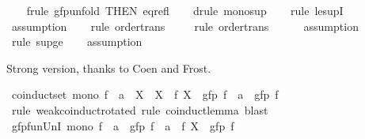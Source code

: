 \begin{isabellebody}
%
\isadelimproof
\ \ %
\endisadelimproof
%
\isatagproof
{}\isamarkupfalse%
\ {\isacharparenleft}{\kern0pt}frule\ gfp{\isacharunderscore}{\kern0pt}unfold\ {\isacharbrackleft}{\kern0pt}THEN\ eq{\isacharunderscore}{\kern0pt}refl{\isacharbrackright}{\kern0pt}{\isacharparenright}{\kern0pt}\isanewline
\ \ \isamarkupfalse%
\ {\isacharparenleft}{\kern0pt}drule\ mono{\isacharunderscore}{\kern0pt}sup{\isacharparenright}{\kern0pt}\isanewline
\ \ \isamarkupfalse%
\ {\isacharparenleft}{\kern0pt}rule\ le{\isacharunderscore}{\kern0pt}supI{\isacharparenright}{\kern0pt}\isanewline
\ \ \ \isamarkupfalse%
\ assumption\isanewline
\ \ \isamarkupfalse%
\ {\isacharparenleft}{\kern0pt}rule\ order{\isacharunderscore}{\kern0pt}trans{\isacharparenright}{\kern0pt}\isanewline
\ \ \ \isamarkupfalse%
\ {\isacharparenleft}{\kern0pt}rule\ order{\isacharunderscore}{\kern0pt}trans{\isacharparenright}{\kern0pt}\isanewline
\ \ \ \ \isamarkupfalse%
\ assumption\isanewline
\ \ \ \isamarkupfalse%
\ {\isacharparenleft}{\kern0pt}rule\ sup{\isacharunderscore}{\kern0pt}ge{}{\isacharparenright}{\kern0pt}\isanewline
\ \ \isamarkupfalse%
\ assumption\isanewline
\ \ \isamarkupfalse%
%
\endisatagproof
{\isafoldproof}%
%
\isadelimproof
%
\endisadelimproof
%
\begin{isamarkuptext}%
Strong version, thanks to Coen and Frost.%
\end{isamarkuptext}\isamarkuptrue%
\isamarkupfalse%
\ coinduct{\isacharunderscore}{\kern0pt}set{\isacharcolon}{\kern0pt}\ {\isachardoublequoteopen}mono\ f\ {\isasymLongrightarrow}\ a\ {\isasymin}\ X\ {\isasymLongrightarrow}\ X\ {\isasymsubseteq}\ f\ {\isacharparenleft}{\kern0pt}X\ {\isasymunion}\ gfp\ f{\isacharparenright}{\kern0pt}\ {\isasymLongrightarrow}\ a\ {\isasymin}\ gfp\ f{\isachardoublequoteclose}\isanewline
%
\isadelimproof
\ \ %
\endisadelimproof
%
\isatagproof
{}\isamarkupfalse%
\ {\isacharparenleft}{\kern0pt}rule\ weak{\isacharunderscore}{\kern0pt}coinduct{\isacharbrackleft}{\kern0pt}rotated{\isacharbrackright}{\kern0pt}{\isacharcomma}{\kern0pt}\ rule\ coinduct{\isacharunderscore}{\kern0pt}lemma{\isacharparenright}{\kern0pt}\ blast{\isacharplus}{\kern0pt}%
\endisatagproof
{\isafoldproof}%
%
\isadelimproof
\isanewline
%
\endisadelimproof
\isanewline
{}\isamarkupfalse%
\ gfp{\isacharunderscore}{\kern0pt}fun{\isacharunderscore}{\kern0pt}UnI{}{\isacharcolon}{\kern0pt}\ {\isachardoublequoteopen}mono\ f\ {\isasymLongrightarrow}\ a\ {\isasymin}\ gfp\ f\ {\isasymLongrightarrow}\ a\ {\isasymin}\ f\ {\isacharparenleft}{\kern0pt}X\ {\isasymunion}\ gfp\ f{\isacharparenright}{\kern0pt}{\isachardoublequoteclose}\isanewline

\end{isabellebody}
